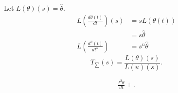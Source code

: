 
Let $L\left( \theta \right) \left( s \right)  = \hat{\theta}$. 
\begin{align*}
	L\left( \frac{d \theta\left( t \right) }{dt} \right) \left( s \right)  &= s L \left( \theta\left( t \right)  \right) \\
	&= s \hat{\theta} \\
	L\left( \frac{d^{n}\left( t \right) }{dt ^{n}} \right) &= s^{n}\hat{\theta} 
\end{align*} 
\[
	T_{\sum}\left( s \right)  = \frac{L\left( \theta \right) \left( s \right) }{L\left( u \right) \left( s \right) }
.\] 

\begin{align*}
	\frac{t ^2 \theta}{dt} + 
.\end{align*}

